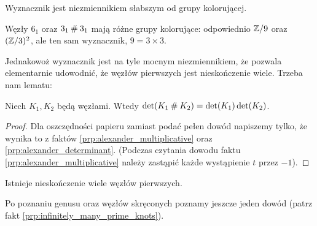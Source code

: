 Wyznacznik jest niezmiennikiem słabszym od grupy kolorującej.

\begin{example}
    Węzły $6_1$ oraz $3_1 \mathbin{\#} 3_1$ mają różne grupy kolorujące: odpowiednio $\mathbb Z/9$ oraz ~$(\mathbb Z/3)^2$, ale ten sam wyznacznik, $9 = 3 \times 3$.
\end{example}

Jednakowoż wyznacznik jest na tyle mocnym niezmiennikiem, że pozwala elementarnie udowodnić, że węzłów pierwszych jest nieskończenie wiele.
Trzeba nam lematu:

\begin{lemma}
\label{lem:det_multiplicativ}%
    Niech $K_1, K_2$ będą węzłami.
    Wtedy $\det(K_1 \mathbin{\#} K_2) = \det(K_1) \det(K_2)$.
\end{lemma}

\begin{proof}
    Dla oszczędności papieru zamiast podać pełen dowód napiszemy tylko, że wynika to z faktów \ref{prp:alexander_multiplicative} oraz \ref{prp:alexander_determinant}.
    (Podczas czytania dowodu faktu \ref{prp:alexander_multiplicative} należy zastąpić każde wystąpienie $t$ przez $-1$).
\end{proof}

\begin{proposition}
\label{prop:infinite_prime_knots_1}%
    Istnieje nieskończenie wiele węzłów pierwszych.
\end{proposition}

Po poznaniu genusu oraz węzłów skręconych poznamy jeszcze jeden dowód (patrz fakt \ref{prp:infinitely_many_prime_knots}).

